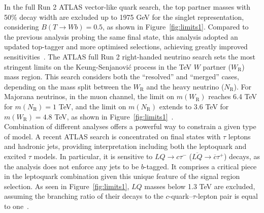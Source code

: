 \documentclass{moriond}
\begin{document}
In the full Run 2 ATLAS vector-like quark search, the top partner masses with
50\% decay width are excluded up to 1975 GeV for the singlet representation,
considering $B(T\rightarrow Wb)=0.5$, as shown in
Figure~\ref{fig:limits1}. Compared to the previous analysis
probing the same final state, this analysis adopted an updated top-tagger and
more optimised selections, achieving greatly improved sensitivities~\cite{vlq}. The
ATLAS full Run 2 right-handed neutrino search sets the most stringent limits on
the Keung-Senjanovi\'c process in the TeV $W$ partner ($W_{\mathrm{R}}$) mass
region. This search considers both the ``resolved'' and ``merged'' cases,
depending on the mass split between the $W_{\mathrm{R}}$ and the heavy neutrino
($N_{\mathrm{R}}$). For Majorana neutrinos, in the muon channel, the limit on
$m(W_{\mathrm{R}})$ reaches 6.4 TeV for $m(N_{\mathrm{R}})=1$ TeV, and the
limit on $m(N_{\mathrm{R}})$ extends to 3.6 TeV for $m(W_{\mathrm{R}})=4.8$
TeV, as shown in Figure~\ref{fig:limits1}~\cite{rhn}.\\           

Combination of different analyses offers a powerful way to constrain a given
type of model. A recent ATLAS search is concentrated on final states with $\tau$ leptons
and hadronic jets, providing interpretation including both the leptoquark and
excited $\tau$ models. In particular, it is sensitive to $LQ\rightarrow
c\tau^{-}$ ($\overline{LQ}\rightarrow\overline{c}\tau^{+}$) decays, as the
analysis does not enforce any jets to be $b$-tagged. It comprises a critical
piece in the leptoquark combination given this unique feature of the signal
region selection. As seen in Figure~\ref{fig:limits1},
$LQ$ masses below 1.3 TeV are excluded, assuming the branching ratio of their
decays to the $c$-quark–$\tau$-lepton pair is equal to one~\cite{tau}.\\   
\end{document}
